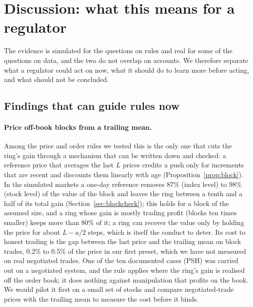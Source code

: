 \section{Discussion: what this means for a regulator}\label{sec:discussion}

The evidence is simulated for the questions on rules and real for some of the questions on data, and the two do not overlap on accounts. We therefore separate what a regulator could act on now, what it should do to learn more before acting, and what should not be concluded.

\subsection{Findings that can guide rules now}

\paragraph{Price off-book blocks from a trailing mean.} Among the price and order rules we tested this is the only one that cuts the ring's gain through a mechanism that can be written down and checked: a reference price that averages the last $L$ prices credits a push only for increments that are recent and discounts them linearly with age (Proposition~\ref{prop:block}). In the simulated markets a one-day reference removes 87\% (index level) to 98\% (stock level) of the value of the block and leaves the ring between a tenth and a half of its total gain (Section~\ref{sec:blockcheck}); this holds for a block of the assumed size, and a ring whose gain is mostly trading profit (blocks ten times smaller) keeps more than 80\% of it; a ring can recover the value only by holding the price for about $L-a/2$ steps, which is itself the conduct to deter. Its cost to honest trading is the gap between the last price and the trailing mean on block trades, 0.2\% to 0.5\% of the price in our first preset, which we have not measured on real negotiated trades. One of the ten documented cases (PSH) was carried out on a negotiated system, and the rule applies where the ring's gain is realised off the order book; it does nothing against manipulation that profits on the book. We would pilot it first on a small set of stocks and compare negotiated-trade prices with the trailing mean to measure the cost before it binds.

